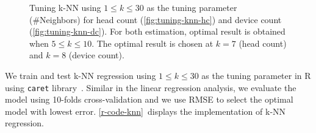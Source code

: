 	\begin{figure}[H]
		\begin{adjustwidth}{-0.5cm}{}
		\centering
		\end{adjustwidth}
		\caption[Tuning \ac{k-NN}.]
		{Tuning \ac{k-NN} using $1 \le k \le 30$ as the tuning parameter (\#Neighbors) for head count (\ref{fig:tuning-knn-hc}) and device count (\ref{fig:tuning-knn-dc}). For both estimation, optimal result is obtained when $5 \le k \le 10$. The optimal result is chosen at $k=7$ (head count) and $k=8$ (device count).}
		\label{fig:tuning-knn}
	\end{figure}

	We train and test \ac{k-NN} regression using $1 \le k \le 30$ as the tuning parameter in R using \verb|caret| library~\cite{caret}. Similar in the linear regression analysis, we evaluate the model using 10-folds cross-validation and we use \ac{RMSE} to select the optimal model with lowest error. \autoref{r-code-knn}~displays the implementation of \ac{k-NN} regression.

